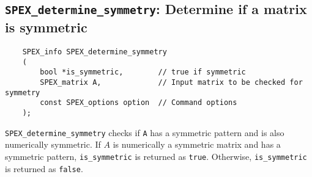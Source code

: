 \documentclass[12pt,oneside]{book}
\theoremstyle{definition}
\begin{document}
\subsection{\texttt{SPEX\_determine\_symmetry}: Determine if a matrix is symmetric}
\begin{mdframed}[userdefinedwidth=\textwidth]
{\footnotesize
\begin{verbatim}
    SPEX_info SPEX_determine_symmetry
    (
        bool *is_symmetric,        // true if symmetric
        SPEX_matrix A,             // Input matrix to be checked for symmetry
        const SPEX_options option  // Command options
    ); 
\end{verbatim}
} \end{mdframed}

\verb|SPEX_determine_symmetry| checks if \verb|A| has a symmetric pattern and is also numerically symmetric. If $A$ is numerically a symmetric matrix
and has a symmetric pattern,
\verb|is_symmetric| is returned as \verb|true|.
Otherwise,
\verb|is_symmetric| is returned as \verb|false|.


\end{document}
